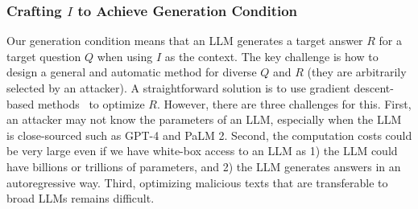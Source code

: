 \vspace{-2mm}
\subsubsection{Crafting $I$ to Achieve Generation Condition} 
\label{subsubsection:generate-I}
Our generation condition means that an LLM generates a target answer $R$ for a target question $Q$ when using $I$ as the context. 
The key challenge is how to design a general and automatic method for diverse $Q$ and $R$ (they are arbitrarily selected by an attacker).  A straightforward solution is to use gradient descent-based methods~\cite{ebrahimi2018hotflip,zou2023universal} to optimize $R$. However, there are three challenges for this. First, an attacker may not know the parameters of an LLM, especially when the LLM is close-sourced such as GPT-4 and PaLM 2. Second, the computation costs could be very large even if we have white-box access to an LLM as 1) the LLM could have billions or trillions of parameters, and 2) the LLM generates answers in an autoregressive way. Third, optimizing malicious texts that are transferable to broad LLMs remains difficult. 


